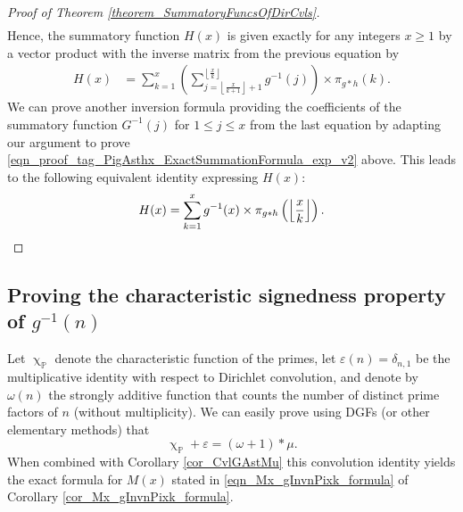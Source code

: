 \documentclass[11pt,reqno,a4letter]{article}
\numberwithin{figure}{section}
\numberwithin{table}{section}
\newcommand{\floor}[1]{\left\lfloor #1 \right\rfloor}
\renewcommand{\chi}{\upchi}
\newcommand{\Floor}[2]{\ensuremath{\left\lfloor \frac{#1}{#2} \right\rfloor}}
\theoremstyle{plain}
\numberwithin{theorem}{section}
\theoremstyle{definition}
\begin{document}
\begin{proof}[Proof of Theorem \ref{theorem_SummatoryFuncsOfDirCvls}]
\begin{align*}
\end{align*} 
Hence, the summatory function $H(x)$ is given exactly for any integers $x \geq 1$ 
by a vector product with the inverse matrix from the previous equation by 
\begin{align*} 
H(x) & = \sum_{k=1}^x \left(\sum_{j=\floor{\frac{x}{k+1}}+1}^{\floor{\frac{x}{k}}} g^{-1}(j)\right) 
     \times \pi_{g \ast h}(k). 
\end{align*} 
We can prove another inversion formula providing the coefficients of the summatory function 
$G^{-1}(j)$ for $1 \leq j \leq x$ from the last equation by adapting our argument to prove 
\eqref{eqn_proof_tag_PigAsthx_ExactSummationFormula_exp_v2} above. 
This leads to the following equivalent identity expressing $H(x)$: 
\[
H(x) = \sum_{k=1}^{x} g^{-1}(x) \times \pi_{g \ast h}\left(\Floor{x}{k}\right). 
     \qedhere 
\]
\end{proof} 

\subsection{Proving the characteristic signedness property of $g^{-1}(n)$} 

Let $\chi_{\mathbb{P}}$ denote the characteristic function of the primes, let 
$\varepsilon(n) = \delta_{n,1}$ be the multiplicative identity with respect to Dirichlet convolution, 
and denote by $\omega(n)$ the strongly additive function that counts the number of 
distinct prime factors of $n$ (without multiplicity). We can easily prove using DGFs 
(or other elementary methods) that 
\begin{equation}
\label{eqn_AntiqueDivisorSumIdent} 
\chi_{\mathbb{P}} + \varepsilon = (\omega + 1) \ast \mu. 
\end{equation} 
When combined with Corollary \ref{cor_CvlGAstMu} 
this convolution identity yields the exact 
formula for $M(x)$ stated in \eqref{eqn_Mx_gInvnPixk_formula} of 
Corollary \ref{cor_Mx_gInvnPixk_formula}. 
\end{document}
